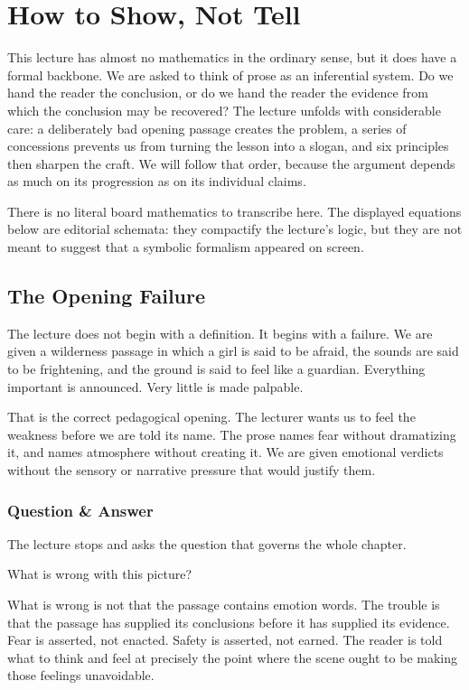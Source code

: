 \chapter{How to Show, Not Tell}

This lecture has almost no mathematics in the ordinary sense, but it does have a formal backbone. We are asked to think of prose as an inferential system. Do we hand the reader the conclusion, or do we hand the reader the evidence from which the conclusion may be recovered? The lecture unfolds with considerable care: a deliberately bad opening passage creates the problem, a series of concessions prevents us from turning the lesson into a slogan, and six principles then sharpen the craft. We will follow that order, because the argument depends as much on its progression as on its individual claims.

\begin{remark}
There is no literal board mathematics to transcribe here. The displayed equations below are editorial schemata: they compactify the lecture's logic, but they are not meant to suggest that a symbolic formalism appeared on screen.
\end{remark}

\section{The Opening Failure}

The lecture does not begin with a definition. It begins with a failure. We are given a wilderness passage in which a girl is said to be afraid, the sounds are said to be frightening, and the ground is said to feel like a guardian. Everything important is announced. Very little is made palpable.

That is the correct pedagogical opening. The lecturer wants us to feel the weakness before we are told its name. The prose names fear without dramatizing it, and names atmosphere without creating it. We are given emotional verdicts without the sensory or narrative pressure that would justify them.

\subsection{Question \& Answer}

The lecture stops and asks the question that governs the whole chapter.

What is wrong with this picture?

What is wrong is not that the passage contains emotion words. The trouble is that the passage has supplied its conclusions before it has supplied its evidence. Fear is asserted, not enacted. Safety is asserted, not earned. The reader is told what to think and feel at precisely the point where the scene ought to be making those feelings unavoidable.

